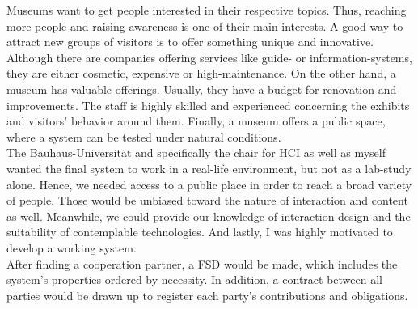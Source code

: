 Museums want to get people interested in their respective topics. Thus, reaching more people and raising awareness is one of their main interests. A good way to attract new groups of visitors is to offer something unique and innovative. Although there are companies offering services like guide- or information-systems, they are either cosmetic, expensive or high-maintenance. On the other hand, a museum has valuable offerings. Usually, they have a budget for renovation and improvements. The staff is highly skilled and experienced concerning the exhibits and visitors' behavior around them. Finally, a museum offers a public space, where a system can be tested under natural conditions.
\\ 
The Bauhaus-Universität and specifically the chair for \ac{HCI} as well as myself wanted the final system to work in a real-life environment, but not as a lab-study alone. Hence, we needed access to a public place in order to reach a broad variety of people. Those would be unbiased toward the nature of interaction and content as well. Meanwhile, we could provide our knowledge of interaction design and the suitability of contemplable technologies. And lastly, I was highly motivated to develop a working system.
\\
After finding a cooperation partner, a \ac{FSD} would be made, which includes the system's properties ordered by necessity. In addition, a contract between all parties would be drawn up to register each party's contributions and obligations.


